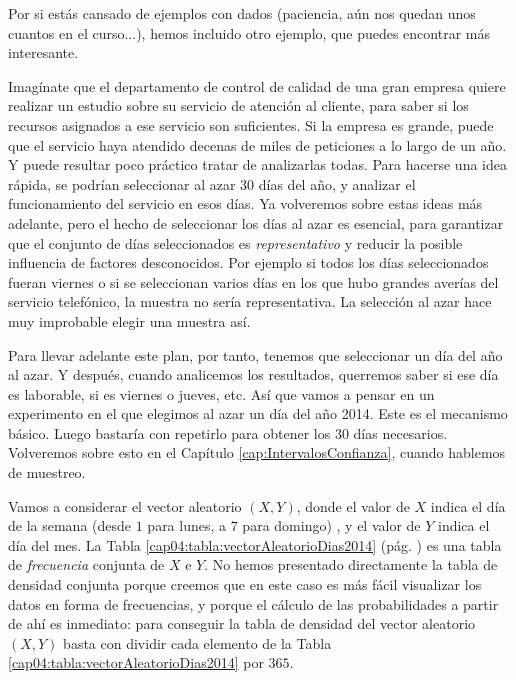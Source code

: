 \noindent Por si estás cansado de ejemplos con dados (paciencia, aún nos quedan unos cuantos en el curso...), hemos incluido otro ejemplo, que puedes encontrar más interesante.
\begin{ejemplo}
\label{cap04:ejem:vectorAleatorioDias2014}
Imagínate que el departamento de control de calidad de una gran empresa quiere realizar un estudio sobre su servicio de atención al cliente, para saber si los recursos asignados a ese servicio son suficientes. Si la empresa es grande, puede que el servicio haya atendido decenas de miles de peticiones a lo largo de un año. Y puede resultar poco práctico tratar de analizarlas todas. Para hacerse una idea rápida, se podrían seleccionar  al azar $30$ días del año, y analizar el funcionamiento del servicio en esos días. Ya volveremos sobre estas ideas más adelante, pero el hecho de seleccionar los días al azar es esencial, para garantizar que el conjunto de días seleccionados  es {\em representativo} y reducir la posible influencia de factores desconocidos. Por ejemplo si todos los días seleccionados fueran viernes o si se seleccionan varios días en los que hubo grandes averías del servicio telefónico, la muestra no sería representativa. La selección al azar hace muy improbable elegir una muestra así.

Para llevar adelante este plan, por tanto, tenemos que seleccionar un día del año al azar. Y después, cuando analicemos los resultados, querremos saber si ese día es laborable, si es viernes o jueves, etc.  Así que vamos a pensar en un experimento en el que elegimos al azar un día del año 2014. Este es el mecanismo básico. Luego bastaría con repetirlo para obtener los 30 días necesarios. Volveremos sobre esto en el Capítulo \ref{cap:IntervalosConfianza}, cuando hablemos de muestreo.

Vamos a considerar el vector aleatorio $(X,Y)$, donde el valor de $X$ indica el día de la semana (desde $1$ para lunes, a $7$ para domingo) , y el valor de $Y$ indica el día del mes. La Tabla \ref{cap04:tabla:vectorAleatorioDias2014} (pág. \pageref{cap04:tabla:vectorAleatorioDias2014}) es una tabla de {\em frecuencia} conjunta de $X$ e $Y$.  No hemos presentado directamente la tabla de densidad conjunta porque creemos que en este caso es más fácil visualizar los datos en forma de frecuencias, y porque el cálculo  de las probabilidades a partir de ahí es inmediato: para conseguir la tabla de densidad del vector aleatorio $(X,Y)$ basta con dividir cada elemento de la Tabla \ref{cap04:tabla:vectorAleatorioDias2014} por $365$.


\end{ejemplo}

